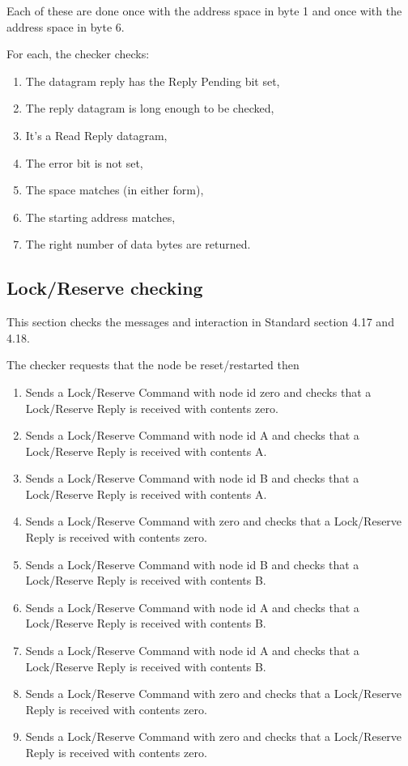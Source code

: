 \documentclass[11pt]{article}
\begin{document}
Each of these are done once with the address space in byte 1 
and once with the address space in byte 6.

For each, the checker checks:
\begin{enumerate}
\item The datagram reply has the Reply Pending bit set,
\item The reply datagram is long enough to be checked,
\item It's a Read Reply datagram,
\item The error bit is not set,
\item The space matches (in either form),
\item The starting address matches,
\item The right number of data bytes are returned.
\end{enumerate}

\subsection{Lock/Reserve checking}

This section checks the messages and interaction in Standard section 4.17 and 4.18.

The checker requests that the node be reset/restarted then 

\begin{enumerate}
\item Sends a Lock/Reserve Command with node id zero
    and checks that a Lock/Reserve Reply is received with contents zero.
\item Sends a Lock/Reserve Command with node id A
    and checks that a Lock/Reserve Reply is received with contents A.
\item Sends a Lock/Reserve Command with node id B
    and checks that a Lock/Reserve Reply is received with contents A.
\item Sends a Lock/Reserve Command with zero 
    and checks that a Lock/Reserve Reply is received with contents zero.
\item Sends a Lock/Reserve Command with node id B
    and checks that a Lock/Reserve Reply is received with contents B.
\item Sends a Lock/Reserve Command with node id A
    and checks that a Lock/Reserve Reply is received with contents B.
\item Sends a Lock/Reserve Command with node id A
    and checks that a Lock/Reserve Reply is received with contents B.
\item Sends a Lock/Reserve Command with zero 
    and checks that a Lock/Reserve Reply is received with contents zero.
\item Sends a Lock/Reserve Command with zero 
    and checks that a Lock/Reserve Reply is received with contents zero.

\end{enumerate}
\end{document}
